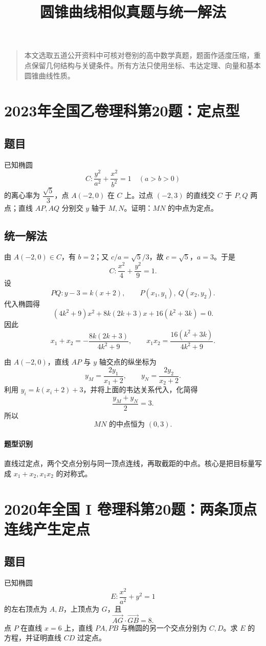 \documentclass[11pt,a4paper]{ctexart}
\title{圆锥曲线相似真题与统一解法}
\author{}
\date{}
\begin{document}
\maketitle

\begin{quote}
本文选取五道公开资料中可核对卷别的高中数学真题，题面作适度压缩，重点保留几何结构与关键条件。所有方法只使用坐标、韦达定理、向量和基本圆锥曲线性质。
\end{quote}

\section{2023年全国乙卷理科第20题：定点型}

\subsection*{题目}
已知椭圆
\[
C:\frac{y^2}{a^2}+\frac{x^2}{b^2}=1\quad(a>b>0)
\]
的离心率为 $\dfrac{\sqrt5}{3}$，点 $A(-2,0)$ 在 $C$ 上。过点 $(-2,3)$ 的直线交 $C$ 于 $P,Q$ 两点；直线 $AP,AQ$ 分别交 $y$ 轴于 $M,N$。证明：$MN$ 的中点为定点。

\subsection*{统一解法}
由 $A(-2,0)\in C$，有 $b=2$；又 $c/a=\sqrt5/3$，故 $c=\sqrt5$，$a=3$。于是
\[
C:\frac{x^2}{4}+\frac{y^2}{9}=1.
\]
设
\[
PQ:y-3=k(x+2),\qquad P(x_1,y_1),\ Q(x_2,y_2).
\]
代入椭圆得
\[
(4k^2+9)x^2+8k(2k+3)x+16(k^2+3k)=0.
\]
因此
\[
x_1+x_2=-\frac{8k(2k+3)}{4k^2+9},\qquad
x_1x_2=\frac{16(k^2+3k)}{4k^2+9}.
\]

由 $A(-2,0)$，直线 $AP$ 与 $y$ 轴交点的纵坐标为
\[
y_M=\frac{2y_1}{x_1+2},\qquad
y_N=\frac{2y_2}{x_2+2}.
\]
利用 $y_i=k(x_i+2)+3$，并将上面的韦达关系代入，化简得
\[
\frac{y_M+y_N}{2}=3.
\]
所以
\[
\boxed{MN\text{ 的中点恒为 }(0,3)}.
\]

\paragraph{题型识别} 直线过定点，两个交点分别与同一顶点连线，再取截距的中点。核心是把目标量写成 $x_1+x_2,x_1x_2$ 的对称式。

\section{2020年全国 I 卷理科第20题：两条顶点连线产生定点}

\subsection*{题目}
已知椭圆
\[
E:\frac{x^2}{a^2}+y^2=1
\]
的左右顶点为 $A,B$，上顶点为 $G$，且
\[
\overrightarrow{AG}\cdot\overrightarrow{GB}=8.
\]
点 $P$ 在直线 $x=6$ 上，直线 $PA,PB$ 与椭圆的另一个交点分别为 $C,D$。求 $E$ 的方程，并证明直线 $CD$ 过定点。
\end{document}
